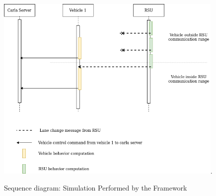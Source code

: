  \begin{figure}[h!]
    \centering
    \includegraphics[width=11cm]{Framework/Images/Untitled Diagram(1).png}.
    \caption{Sequence diagram: Simulation Performed by the Framework}
    \label{sequence}
\end{figure}
 
